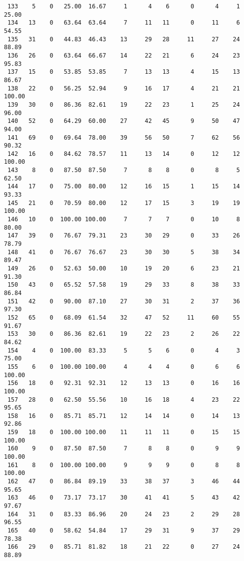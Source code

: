 \begin{verbatim}
 133    5    0   25.00  16.67     1      4    6      0      4     1    25.00
 134   13    0   63.64  63.64     7     11   11      0     11     6    54.55
 135   31    0   44.83  46.43    13     29   28     11     27    24    88.89
 136   26    0   63.64  66.67    14     22   21      6     24    23    95.83
 137   15    0   53.85  53.85     7     13   13      4     15    13    86.67
 138   22    0   56.25  52.94     9     16   17      4     21    21   100.00
 139   30    0   86.36  82.61    19     22   23      1     25    24    96.00
 140   52    0   64.29  60.00    27     42   45      9     50    47    94.00
 141   69    0   69.64  78.00    39     56   50      7     62    56    90.32
 142   16    0   84.62  78.57    11     13   14      0     12    12   100.00
 143    8    0   87.50  87.50     7      8    8      0      8     5    62.50
 144   17    0   75.00  80.00    12     16   15      1     15    14    93.33
 145   21    0   70.59  80.00    12     17   15      3     19    19   100.00
 146   10    0  100.00 100.00     7      7    7      0     10     8    80.00
 147   39    0   76.67  79.31    23     30   29      0     33    26    78.79
 148   41    0   76.67  76.67    23     30   30      5     38    34    89.47
 149   26    0   52.63  50.00    10     19   20      6     23    21    91.30
 150   43    0   65.52  57.58    19     29   33      8     38    33    86.84
 151   42    0   90.00  87.10    27     30   31      2     37    36    97.30
 152   65    0   68.09  61.54    32     47   52     11     60    55    91.67
 153   30    0   86.36  82.61    19     22   23      2     26    22    84.62
 154    4    0  100.00  83.33     5      5    6      0      4     3    75.00
 155    6    0  100.00 100.00     4      4    4      0      6     6   100.00
 156   18    0   92.31  92.31    12     13   13      0     16    16   100.00
 157   28    0   62.50  55.56    10     16   18      4     23    22    95.65
 158   16    0   85.71  85.71    12     14   14      0     14    13    92.86
 159   18    0  100.00 100.00    11     11   11      0     15    15   100.00
 160    9    0   87.50  87.50     7      8    8      0      9     9   100.00
 161    8    0  100.00 100.00     9      9    9      0      8     8   100.00
 162   47    0   86.84  89.19    33     38   37      3     46    44    95.65
 163   46    0   73.17  73.17    30     41   41      5     43    42    97.67
 164   31    0   83.33  86.96    20     24   23      2     29    28    96.55
 165   40    0   58.62  54.84    17     29   31      9     37    29    78.38
 166   29    0   85.71  81.82    18     21   22      0     27    24    88.89

\end{verbatim}
